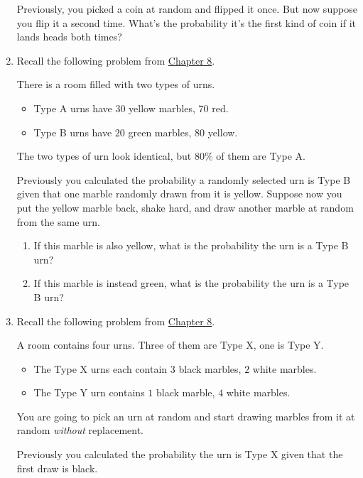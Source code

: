 \documentclass[justified]{tufte-book}
\providecommand{\tightlist}{%
  \setlength{\itemsep}{0pt}\setlength{\parskip}{0pt}}
\theoremstyle{definition}
\theoremstyle{definition}
\theoremstyle{definition}
\theoremstyle{remark}
\begin{document}
\begin{enumerate}
  Previously, you picked a coin at random and flipped it once. But now
  suppose you flip it a second time. What's the probability it's the
  first kind of coin if it lands heads both times?
\item
  Recall the following problem from
  \protect\hyperlink{bayes-theorem}{Chapter 8}.

  There is a room filled with two types of urns.

  \begin{itemize}
  \tightlist
  \item
    Type A urns have \(30\) yellow marbles, \(70\) red.
  \item
    Type B urns have \(20\) green marbles, \(80\) yellow.
  \end{itemize}

  The two types of urn look identical, but \(80\%\) of them are Type A.

  Previously you calculated the probability a randomly selected urn is
  Type B given that one marble randomly drawn from it is yellow. Suppose
  now you put the yellow marble back, shake hard, and draw another
  marble at random from the same urn.

  \begin{enumerate}
  \def\labelenumii{\alph{enumii}.}
  \tightlist
  \item
    If this marble is also yellow, what is the probability the urn is a
    Type B urn?
  \item
    If this marble is instead green, what is the probability the urn is
    a Type B urn?
  \end{enumerate}
\item
  Recall the following problem from
  \protect\hyperlink{bayes-theorem}{Chapter 8}.

  A room contains four urns. Three of them are Type X, one is Type Y.

  \begin{itemize}
  \tightlist
  \item
    The Type X urns each contain \(3\) black marbles, \(2\) white
    marbles.
  \item
    The Type Y urn contains \(1\) black marble, \(4\) white marbles.
  \end{itemize}

  You are going to pick an urn at random and start drawing marbles from
  it at random \emph{without} replacement.

  Previously you calculated the probability the urn is Type X given that
  the first draw is black.


\end{enumerate}
\end{document}
